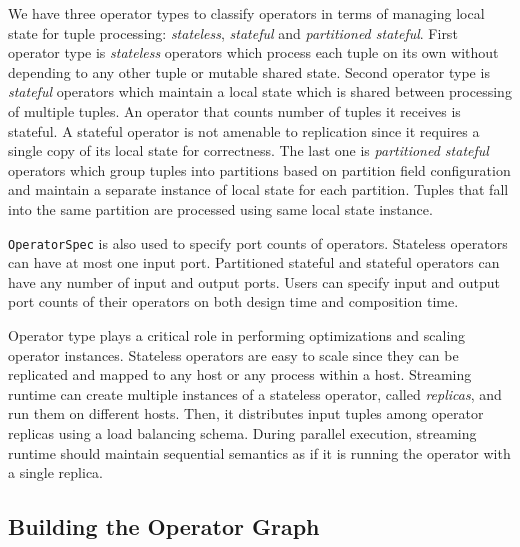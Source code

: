 We have three operator types to classify operators in terms of managing local state for tuple processing: \textit{stateless}, \textit{stateful} and \textit{partitioned stateful}. First operator type is \textit{stateless} operators which process each tuple on its own without depending to any other tuple or mutable shared state. Second operator type is \textit{stateful} operators which maintain a local state which is shared between processing of multiple tuples. An operator that counts number of tuples it receives is stateful. A stateful operator is not amenable to replication since it requires a single copy of its local state for correctness. The last one is \textit{partitioned stateful} operators which group tuples into partitions based on partition field configuration and maintain a separate instance of local state for each partition. Tuples that fall into the same partition are processed using same local state instance. 

\texttt{OperatorSpec} is also used to specify port counts of operators. Stateless operators can have at most one input port. Partitioned stateful and stateful operators can have any number of input and output ports. Users can specify input and output port counts of their operators on both design time and composition time. 

Operator type plays a critical role in performing optimizations and scaling operator instances. Stateless operators are easy to scale since they can be replicated and mapped to any host or any process within a host. Streaming runtime can create multiple instances of a stateless operator, called \textit{replicas}, and run them on different hosts. Then, it distributes input tuples among operator replicas using a load balancing schema. During parallel execution, streaming runtime should maintain sequential semantics as if it is running the operator with a single replica.



\subsection{Building the Operator Graph}\label{sec:operator-graph}